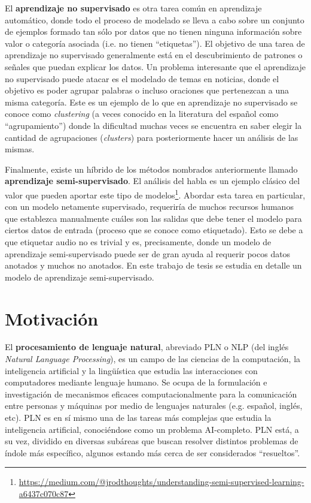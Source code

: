El \textbf{aprendizaje no supervisado} es otra tarea común en aprendizaje automático, donde todo el proceso de modelado se lleva a cabo sobre un conjunto de ejemplos formado tan sólo por datos que no tienen ninguna información sobre valor o categoría asociada (i.e. no tienen ``etiquetas''). El objetivo de una tarea de aprendizaje no supervisado generalmente está en el descubrimiento de patrones o señales que puedan explicar los datos. Un problema interesante que el aprendizaje no supervisado puede atacar es el modelado de temas en noticias, donde el objetivo es poder agrupar palabras o incluso oraciones que pertenezcan a una misma categoría. Este es un ejemplo de lo que en aprendizaje no supervisado se conoce como \textit{clustering} (a veces conocido en la literatura del español como ``agrupamiento'') donde la dificultad muchas veces se encuentra en saber elegir la cantidad de agrupaciones (\textit{clusters}) para posteriormente hacer un análisis de las mismas.

Finalmente, existe un híbrido de los métodos nombrados anteriormente llamado \textbf{aprendizaje semi-supervisado}. El análisis del habla es un ejemplo clásico del valor que pueden aportar este tipo de modelos\footnote{\url{https://medium.com/@jrodthoughts/understanding-semi-supervised-learning-a6437c070c87}}. Abordar esta tarea en particular, con un modelo netamente supervisado, requeriría de muchos recursos humanos que establezca manualmente cuáles son las salidas que debe tener el modelo para ciertos datos de entrada (proceso que se conoce como etiquetado). Esto se debe a que etiquetar audio no es trivial y es, precisamente, donde un modelo de aprendizaje semi-supervisado puede ser de gran ayuda al requerir pocos datos anotados y muchos no anotados. En este trabajo de tesis se estudia en detalle un modelo de aprendizaje semi-supervisado.

\section{Motivación}

El \textbf{procesamiento de lenguaje natural}, abreviado PLN o NLP (del inglés \textit{Natural Language Processing}), es un campo de las ciencias de la computación, la inteligencia artificial y la lingüística que estudia las interacciones con computadores mediante lenguaje humano. Se ocupa de la formulación e investigación de mecanismos eficaces computacionalmente para la comunicación entre personas y máquinas por medio de lenguajes naturales (e.g. español, inglés, etc). PLN es en sí mismo una de las tareas más complejas que estudia la inteligencia artificial, conociéndose como un problema AI-completo. PLN está, a su vez, dividido en diversas subáreas que buscan resolver distintos problemas de índole más específico, algunos estando más cerca de ser considerados ``resueltos''.

